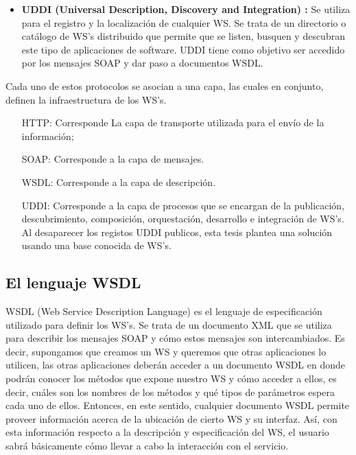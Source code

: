 \begin{itemize}
	\item \textbf{UDDI (Universal Description, Discovery and Integration) \cite{UDDI}:} Se utiliza para el registro y la localización de cualquier WS. Se trata de un directorio o catálogo de WS's distribuido que permite que se listen, busquen y descubran este tipo de aplicaciones de software.
	UDDI tiene como objetivo ser accedido por los mensajes SOAP y dar paso a documentos WSDL.\\
\end{itemize}


Cada uno de estos protocolos se asocian a una capa, las cuales en conjunto, definen la infraestructura de los WS's.\\


\begin{itemize}
	\setlength{\itemindent}{.5in}
	\item[HTTP:] Corresponde La capa de transporte utilizada para el envío de la información;
	\item[SOAP:] Corresponde a la capa de mensajes.
	\item[WSDL:] Corresponde a la capa de descripción.
	\item[UDDI:] Corresponde a la capa de procesos que se encargan de la publicación, descubrimiento, composición, orquestación, desarrollo e integración de WS's. Al desaparecer los registos UDDI publicos, esta tesis plantea una solución usando una base conocida de WS's.
\end{itemize}

\subsection{El lenguaje WSDL}
\label{El lenguaje WSDL}

WSDL (Web Service Description Language) es el lenguaje de especificación utilizado para definir los WS's. Se trata de un documento XML que se utiliza para describir los mensajes SOAP y cómo estos mensajes son intercambiados. Es decir, supongamos que creamos un WS y queremos que otras aplicaciones lo utilicen, las otras aplicaciones deberán acceder a un documento WSDL en donde podrán conocer los métodos que expone nuestro WS y cómo acceder a ellos, es decir, cuáles son los nombres de los métodos y qué tipos de parámetros espera cada uno de ellos. Entonces, en este sentido, cualquier documento WSDL permite proveer información acerca de la ubicación de cierto WS y su interfaz. Así, con esta información respecto a la descripción y especificación del WS, el usuario sabrá básicamente cómo llevar a cabo la interacción con el servicio.\\

